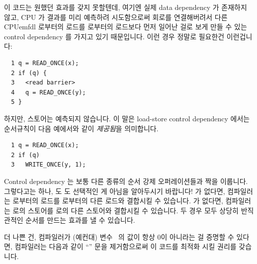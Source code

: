 이 코드는 원했던 효과를 갖지 못할텐데, 여기엔 실제 data dependency 가 존재하지
않고, CPU 가 결과를 미리 예측하려 시도함으로써 회로를 연결해버려서 다른
CPUemfdl  로부터의 로드를  로부터의 로드보다 먼저 일어난 걸로 보게
만들 수 있는 control dependency 를 가지고 있기 때문입니다.
이런 경우 정말로 필요한건 이런겁니다:

\vspace{5pt}
\begin{minipage}[t]{\columnwidth}
\scriptsize
\begin{verbatim}
  1 q = READ_ONCE(x);
  2 if (q) {
  3   <read barrier>
  4   q = READ_ONCE(y);
  5 }
\end{verbatim}
\end{minipage}
\vspace{5pt}

하지만, 스토어는 예측되지 않습니다.
이 말은 load-store control dependency 에서는 순서규칙이 다음 예에서와 같이
\emph{제공됨}을 의미합니다.

\vspace{5pt}
\begin{minipage}[t]{\columnwidth}
\scriptsize
\begin{verbatim}
  1 q = READ_ONCE(x);
  2 if (q)
  3   WRITE_ONCE(y, 1);
\end{verbatim}
\end{minipage}
\vspace{5pt}

Control dependency 는 보통 다른 종류의 순서 강제 오퍼레이션들과 짝을 이룹니다.
그렇다고는 하나,  도  도 선택적인 게 아님을
알아두시기 바랍니다!
 가 없다면, 컴파일러는  로부터의 로드를  로부터의
다른 로드와 결합시킬 수 있습니다.
 가 없다면, 컴파일러는  로의 스토어를  로의 다른
스토어와 결합시킬 수 있습니다.
두 경우 모두 상당히 반직관적인 순서를 만드는 효과를 낼 수 있습니다.

더 나쁜 건, 컴파일러가 (예컨대) 변수~ 의 값이 항상 0이 아니라는 걸 증명할
수 있다면, 컴파일러는 다음과 같이 ``'' 문을 제거함으로써 이 코드를
최적화 시킬 권리를 갖습니다.
\iffalse

